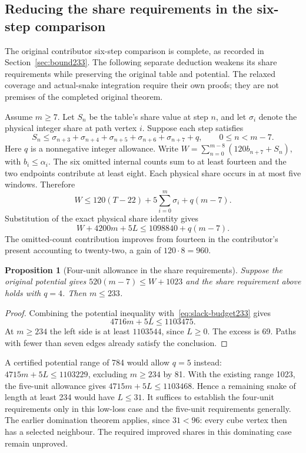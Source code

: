 \documentclass[11pt,a4paper]{article}
\newtheorem{proposition}[theorem]{Proposition}
\theoremstyle{definition}
\theoremstyle{remark}
\begin{document}
\subsection{Reducing the share requirements in the six-step comparison}\label{sec:slack233}
The original contributor six-step comparison is complete, as recorded
in Section~\ref{sec:bound233}. The following separate deduction weakens
its share requirements while preserving the original table and potential.
The relaxed coverage and actual-snake integration require their own proofs;
they are not premises of the completed original theorem.

Assume $m\ge7$. Let $S_n$ be the table's share value at step $n$,
and let $\sigma_i$ denote the physical integer share at path vertex $i$.
Suppose each step satisfies
\[
S_n\le\sigma_{n+3}+\sigma_{n+4}+\sigma_{n+5}
       +\sigma_{n+6}+\sigma_{n+7}+q,
\qquad 0\le n<m-7.
\]
Here $q$ is a nonnegative integer allowance. Write
$W=\sum_{n=0}^{m-8}(120b_{n+7}+S_n)$, with $b_i\le\alpha_i$.
The six omitted internal counts sum to at least fourteen and the two
endpoints contribute at least eight. Each physical share occurs in at
most five windows. Therefore
\[
W\le120(T-22)+5\sum_{i=0}^{m}\sigma_i+q(m-7).
\]
Substitution of the exact physical share identity gives
\begin{equation}\label{eq:slack-budget233}
W+4200m+5L\le1098840+q(m-7).
\end{equation}
The omitted-count contribution improves from fourteen in the contributor's
present accounting to twenty-two, a gain of $120\cdot8=960$.

\begin{proposition}[Four-unit allowance in the share requirements]
Suppose the original potential gives $520(m-7)\le W+1023$ and the
share requirement above holds with $q=4$. Then $m\le233$.
\end{proposition}
\begin{proof}
Combining the potential inequality with~\eqref{eq:slack-budget233} gives
\[
4716m+5L\le1103475.
\]
At $m\ge234$ the left side is at least $1103544$, since $L\ge0$.
The excess is 69. Paths with fewer than seven edges already satisfy
the conclusion.
\end{proof}

A certified potential range of 784 would allow $q=5$ instead:
$4715m+5L\le1103229$, excluding $m\ge234$ by 81. With the existing
range 1023, the five-unit allowance gives
$4715m+5L\le1103468$. Hence a remaining snake of length at least 234
would have $L\le31$. It suffices to establish the four-unit requirements
only in this low-loss case and the five-unit requirements generally.
The earlier domination theorem applies, since $31<96$: every cube vertex
then has a selected neighbour. The required improved shares in this
dominating case remain unproved.
\end{document}
